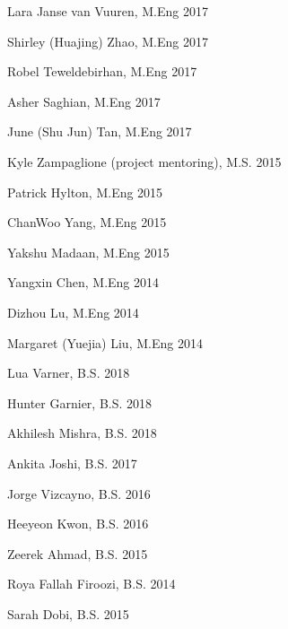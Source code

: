 \documentclass[letterpaper]{deedy-resume} %
\begin{document}

\begin{minipage}[t]{0.5\textwidth}

{}

\begin{tightitemize}

\item Lara Janse van Vuuren, M.Eng 2017
\item Shirley (Huajing) Zhao, M.Eng 2017
\item Robel Teweldebirhan, M.Eng 2017
\item Asher Saghian, M.Eng 2017
\item June (Shu Jun) Tan, M.Eng 2017
\item Kyle Zampaglione (project mentoring), M.S. 2015
\item Patrick Hylton, M.Eng 2015
\item ChanWoo Yang, M.Eng 2015
\item Yakshu Madaan, M.Eng 2015
\item Yangxin Chen, M.Eng 2014
\item Dizhou Lu, M.Eng 2014
\item Margaret (Yuejia) Liu, M.Eng 2014

\end{tightitemize}

\end{minipage}%
\begin{minipage}[t]{0.5\textwidth}

  \vspace{0.05cm}
  
{}

\begin{tightitemize}

\item Lua Varner,  B.S. 2018
\item Hunter Garnier, B.S. 2018
\item Akhilesh Mishra, B.S. 2018
\item Ankita Joshi, B.S. 2017
\item Jorge Vizcayno, B.S. 2016
\item Heeyeon Kwon, B.S. 2016
\item Zeerek Ahmad, B.S. 2015
\item Roya Fallah Firoozi, B.S. 2014
\item Sarah Dobi, B.S. 2015


\end{tightitemize}

\end{minipage}
\end{document}
